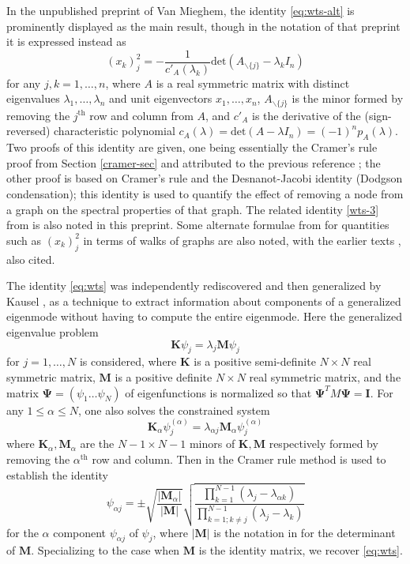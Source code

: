 \documentclass{amsart}
\begin{document}
In the unpublished preprint \cite{2014arXiv1401.4580V} of Van Mieghem, the identity \eqref{eq:wts-alt} is prominently displayed as the main result, though in the notation of that preprint it is expressed instead as
$$ (x_k)_j^2 = -\frac{1}{c'_A(\lambda_k)} \mathrm{det}( A_{\backslash \{j\}} - \lambda_k I_n )$$
for any $j,k=1,\dots,n$, where $A$ is a real symmetric matrix with distinct eigenvalues $\lambda_1,\dots,\lambda_n$ and unit eigenvectors $x_1,\dots,x_n$, $A_{\backslash \{j\}}$ is the minor formed by removing the $j^{\mathrm{th}}$ row and column from $A$, and $c'_A$ is the derivative of the (sign-reversed) characteristic polynomial $c_A(\lambda) = \mathrm{det}(A - \lambda I_n) = (-1)^n p_A(\lambda)$.  Two proofs of this identity are given, one being essentially the Cramer's rule proof from Section \ref{cramer-sec} and attributed to the previous reference \cite{CVETKOVIC2007146}; the other proof is based on Cramer's rule and the Desnanot-Jacobi identity (Dodgson condensation); this identity is used to quantify the effect of removing a node from a graph on the spectral properties of that graph.  The related identity \eqref{wts-3} from \cite{tao2011} is also noted in this preprint.  Some alternate formulae from \cite{vmbook} for quantities such as $(x_k)_j^2$ in terms of walks of graphs are also noted, with the earlier texts \cite{godsil-book}, \cite{golub} also cited.

The identity \eqref{eq:wts} was independently rediscovered and then generalized by Kausel \cite{Kausel2018}, as a technique to extract information about components of a generalized eigenmode without having to compute the entire eigenmode.  Here the generalized eigenvalue problem
$$ \mathbf{K} \psi_j = \lambda_j \mathbf{M} \psi_j$$
for $j=1,\dots,N$ is considered, where $\mathbf{K}$ is a positive semi-definite $N \times N$ real symmetric matrix, $\mathbf{M}$ is a positive definite $N \times N$ real symmetric matrix, and the matrix $\mathbf{\Psi} = (\psi_1 \dots \psi_N)$ of eigenfunctions is normalized so that $\mathbf{\Psi}^T M \mathbf{\Psi} = \mathbf{I}$.  For any $1 \leq \alpha \leq N$, one also solves the constrained system
$$ \mathbf{K}_\alpha \psi_{j}^{(\alpha)} = \lambda_{\alpha j} \mathbf{M}_\alpha \psi_j^{(\alpha)}$$
where $\mathbf{K}_\alpha, \mathbf{M}_\alpha$ are the $N-1 \times N-1$ minors of $\mathbf{K}, \mathbf{M}$ respectively formed by removing the $\alpha^{\mathrm{th}}$ row and column.  Then in \cite[(18)]{Kausel2018} the Cramer rule method is used to establish the identity
$$ \psi_{\alpha j} = \pm \sqrt{\frac{|\mathbf{M}_\alpha|}{|\mathbf{M}|}} \sqrt{\frac{ \prod_{k=1}^{N-1} (\lambda_j - \lambda_{\alpha k})}{\prod_{k=1; k \neq j}^{N-1} (\lambda_j-\lambda_k)}}$$
for the $\alpha$ component $\psi_{\alpha j}$ of $\psi_j$, where $|\mathbf{M}|$ is the notation in \cite{Kausel2018} for the determinant of $\mathbf{M}$.  Specializing to the case when $\mathbf{M}$ is the identity matrix, we recover \eqref{eq:wts}.
\end{document}
